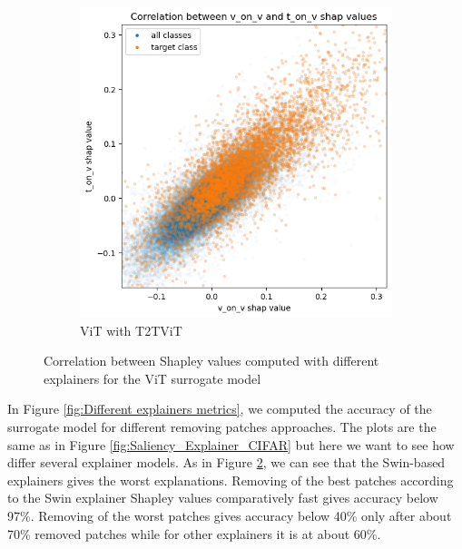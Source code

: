 \documentclass[magisterska,en]{pracamgr}
\begin{document}
\begin{figure}
\begin{subfigure}{.45\textwidth}
  \centering
  \includegraphics[width=1\linewidth]{./images/v_and_t_on_vit.png}
  \caption{ViT with T2T\textunderscore ViT }
  \label{fig:sub1}
\end{subfigure}


\caption{Correlation between Shapley values computed with different explainers for the ViT surrogate model}
\label{fig:Pairs Shapley correlation}
\end{figure}




In Figure \ref{fig:Different explainers metrics}, we computed the accuracy of the surrogate model for different removing patches approaches. The plots are the same as in Figure \ref{fig:Saliency_Explainer_CIFAR} but here we want to see how differ several explainer models. As in Figure \ref{fig:Pairs Shapley correlation}, we can see that the Swin-based explainers gives the worst explanations. Removing of the best patches according to the Swin explainer Shapley values comparatively fast gives accuracy below 97\%. Removing of the worst patches gives accuracy below 40\% only after about 70\% removed patches while for other explainers it is at about 60\%.
\end{document}
